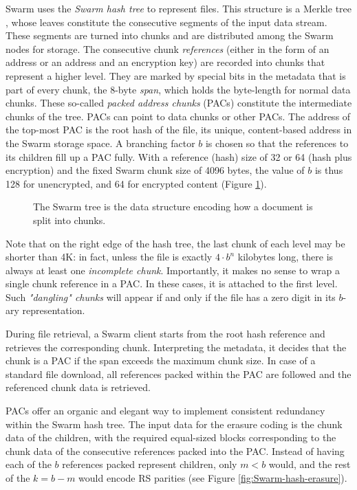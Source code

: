 \documentclass[manuscript,screen,review]{acmart}
\begin{document}
Swarm uses the \emph{Swarm hash tree} to represent files. This structure is a Merkle tree \citep{merkle1980protocols}, whose leaves constitute the consecutive segments of the input data stream. These segments are turned into chunks and are distributed among the Swarm nodes for storage. The consecutive chunk \emph{references} (either in the form of an address or an address and an encryption key) are recorded into chunks that represent a higher level. They are marked by special bits in the metadata that is part of every chunk, the 8-byte \emph{span}, which holds the byte-length for normal data chunks. 
These so-called \emph{packed address chunks} (PACs) constitute the intermediate chunks of the tree. PACs can point to data chunks or other PACs. The address of the top-most PAC is the root hash of the file, its unique, content-based address in the Swarm storage space. 
A branching factor $b$ is chosen so that the references to its children fill up a PAC fully.
With a reference (hash) size of 32 or 64 (hash plus encryption) and the fixed Swarm chunk size of 4096 bytes, the value of $b$ is thus 128 for unencrypted, and 64 for encrypted content
(Figure \ref{fig:Swarm-hash-split}).


\begin{figure}[!ht]
   \centering
   
   \caption[Swarm hash split]{The Swarm tree is the data structure encoding how a document is split into chunks.}
   \label{fig:Swarm-hash-split}
\end{figure}

Note that on the right edge of the hash tree, the last chunk of each level may be shorter than 4K: in fact, unless the file is exactly $4\cdot b^n$ kilobytes long, there is always at least one \emph{incomplete chunk}.  Importantly, it makes no sense to wrap a single chunk reference in a PAC. In these cases, it is attached to the first level. Such \emph{"dangling" chunks} will appear if and only if the file has a zero digit in its $b$-ary representation.

During file retrieval, a Swarm client starts from the root hash reference and retrieves the corresponding chunk. Interpreting the metadata, it decides that the chunk is a PAC if the span exceeds the maximum chunk size.
In case of a standard file download, all references packed within the PAC are followed and the referenced chunk data is retrieved.

PACs offer an organic and elegant way to implement consistent redundancy within the Swarm hash tree.
The input data for the erasure coding is the chunk data of the children, with the required equal-sized blocks corresponding to the chunk data of the consecutive references packed into the PAC. Instead of having each of the $b$ references packed represent children, only $m < b$ would, and the rest of the $k=b-m$ would encode RS parities (see Figure \ref{fig:Swarm-hash-erasure}).
\end{document}
